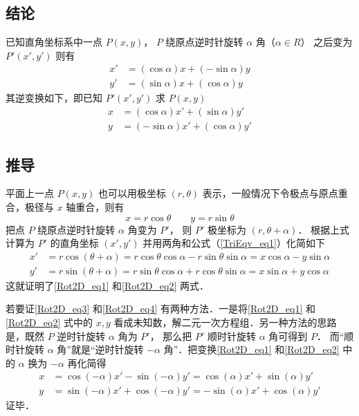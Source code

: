 
\subsection{结论}
已知直角坐标系中一点 $P(x,y)$， $P$ 绕原点逆时针旋转 $\alpha $ 角（$\alpha  \in R$） 之后变为 $P'(x',y')$ 则有
\begin{align}\label{Rot2D_eq1}
x' &= (\cos \alpha)x + (- \sin \alpha)y \\
\label{Rot2D_eq2}
y' &= (\sin \alpha)x + (\cos \alpha)y
\end{align}
其逆变换如下，即已知 $P'(x',y')$ 求 $P(x,y)$ 
\begin{align}\label{Rot2D_eq3}
x &= ( \cos \alpha  )x' + ( \sin \alpha  )y' \\
\label{Rot2D_eq4}
y &= (  - \sin \alpha  )x' + ( \cos \alpha )y'
\end{align}

\subsection{推导}

平面上一点 $P( {x,y} )$ 也可以用极坐标 $( {r,\theta } )$ 表示，一般情况下令极点与原点重合，极径与 $x$ 轴重合，则有
\begin{equation}
x = r\cos \theta \qquad y = r\sin \theta 
\end{equation}     
把点 $P$ 绕原点逆时针旋转 $\alpha $ 角变为 $P'$， 则 $P'$ 极坐标为 $( {r,\theta  + \alpha } )$． 根据上式计算为 $P'$ 的直角坐标 $( {x',y'} )$ 并用两角和公式（\autoref{TriEqv_eq1}）化简如下
\begin{align}
x' &= r\cos ( {\theta  + \alpha } ) = r\cos \theta \cos \alpha  - r\sin \theta \sin \alpha  = x\cos \alpha  - y\sin \alpha \\
y' &= r\sin ( {\theta  + \alpha } ) = r\sin \theta \cos \alpha  + r\cos \theta \sin \alpha  = x\sin \alpha  + y\cos \alpha 
\end{align} 
这就证明了\autoref{Rot2D_eq1} 和\autoref{Rot2D_eq2} 两式．

若要证\autoref{Rot2D_eq3} 和\autoref{Rot2D_eq4} 有两种方法．一是将\autoref{Rot2D_eq1} 和\autoref{Rot2D_eq2} 式中的 $x, y$ 看成未知数，解二元一次方程组．另一种方法的思路是，既然 $P$ 逆时针旋转 $\alpha $ 角为 $P'$， 那么把 $P'$ 顺时针旋转 $\alpha $ 角可得到 $P$． 而“顺时针旋转 $\alpha $ 角”就是“逆时针旋转 $ - \alpha $ 角”．把变换\autoref{Rot2D_eq1} 和\autoref{Rot2D_eq2} 中的 $\alpha $ 换为 $ - \alpha $ 再化简得
 \begin{align}
x &= \cos ( { - \alpha } )x' - \sin ( { - \alpha } )y' = \cos ( \alpha  )x' + \sin ( \alpha  )y'\\
y &= \sin(-\alpha)x' + \cos(- \alpha)y' =  -\sin(\alpha)x' + \cos(\alpha)y'
\end{align}
证毕．
